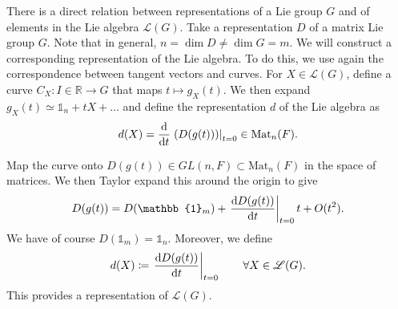 \begin{claim}
  There is a direct relation between representations of a Lie group $G$ and of elements in the Lie algebra $\mathscr{L}(G)$.
  Take a representation $D$ of a matrix Lie group $G$. Note that in general, $n = \dim D \neq \dim G = m$. We will construct a corresponding representation of the Lie algebra.
  To do this, we use again the correspondence between tangent vectors and curves.
  For $X \in \mathscr{L}(G)$, define a curve $C_X \colon I \in \mathbb{R} \to G$ that maps $t \mapsto g_X(t)$. We then expand $g_X(t) \simeq \mathbb{1}_n + t X + \dots$ and define the representation $d$ of the Lie algebra as
  \begin{equation}
    d(X) = \dv{}{t} \left. \left( D(g(t)) \right) \right\rvert_{t=0} \in \text{Mat}_n(F).
  \end{equation}

  Map the curve onto $D(g(t)) \in GL(n, F) \subset \text{Mat}_n(F)$ in the space of matrices.
  We then Taylor expand this around the origin to give
  \begin{equation}
    D(g(t)) = D(\mathbb{1}_m) + \left.\dv{D(g(t))}{t}\right\rvert_{t = 0} t + O(t^2).
  \end{equation}
  We have of course $D(\mathbb{1}_m) = \mathbb{1}_n$. Moreover, we define 
  \begin{equation}
    d(X) \coloneqq \left.\dv{D(g(t))}{t}\right\rvert_{t=0} \qquad \forall X \in \mathscr{L}(G).
  \end{equation}
  This provides a representation of $\mathscr{L}(G)$.
\end{claim}


